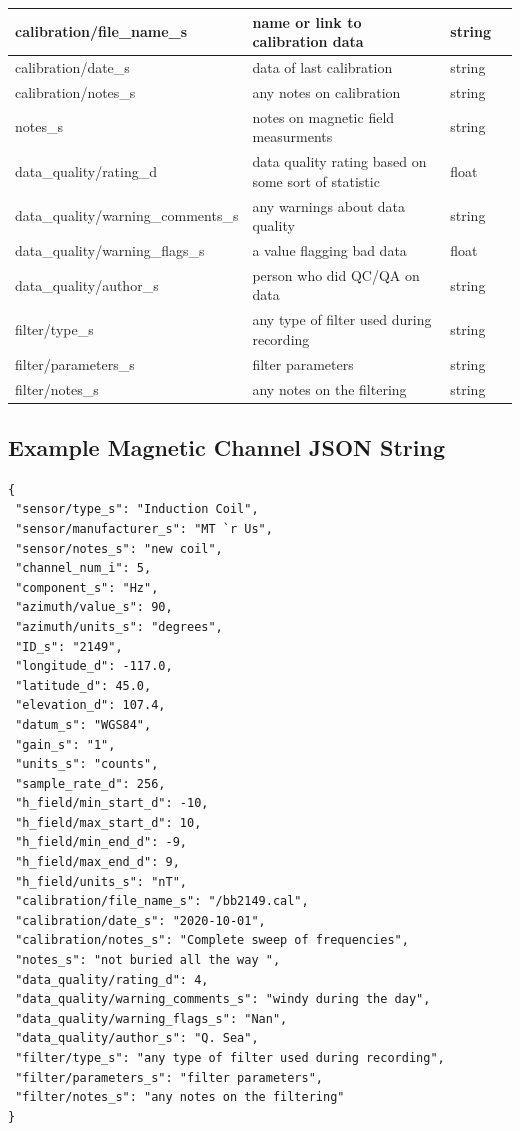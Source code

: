 \documentclass{article}
\begin{document}
\begin{table}[htb!]
\begin{tabular}{|l|p{3in}|l|l|}
		calibration/file\_name\_s & name or link to calibration data & string &  \\ \hline
		calibration/date\_s & data of last calibration & string &  \\ \hline
		calibration/notes\_s & any notes on calibration & string &  \\ \hline
		notes\_s & notes on magnetic field measurments & string &  \\ \hline
		data\_quality/rating\_d & data quality rating based on some sort of statistic & float &  \\ \hline
		data\_quality/warning\_comments\_s & any warnings about data quality & string &  \\ \hline
		data\_quality/warning\_flags\_s & a value flagging bad data  & float &  \\ \hline
		data\_quality/author\_s & person who did QC/QA on data & string &  \\ \hline
		filter/type\_s & any type of filter used during recording & string &  \\ \hline
		filter/parameters\_s & filter parameters & string &  \\ \hline
		filter/notes\_s & any notes on the filtering & string &  \\ \hline
		\end{tabular}
	\label{tab:magnetic}
\end{table}

\newpage
\subsection{Example Magnetic Channel JSON String}

\begin{verbatim}
{
 "sensor/type_s": "Induction Coil",
 "sensor/manufacturer_s": "MT `r Us",
 "sensor/notes_s": "new coil",
 "channel_num_i": 5,
 "component_s": "Hz",
 "azimuth/value_s": 90,
 "azimuth/units_s": "degrees",
 "ID_s": "2149",
 "longitude_d": -117.0,
 "latitude_d": 45.0,
 "elevation_d": 107.4,
 "datum_s": "WGS84",
 "gain_s": "1",
 "units_s": "counts",
 "sample_rate_d": 256,
 "h_field/min_start_d": -10,
 "h_field/max_start_d": 10,
 "h_field/min_end_d": -9,
 "h_field/max_end_d": 9,
 "h_field/units_s": "nT",
 "calibration/file_name_s": "/bb2149.cal",
 "calibration/date_s": "2020-10-01",
 "calibration/notes_s": "Complete sweep of frequencies",
 "notes_s": "not buried all the way ",
 "data_quality/rating_d": 4,
 "data_quality/warning_comments_s": "windy during the day",
 "data_quality/warning_flags_s": "Nan",
 "data_quality/author_s": "Q. Sea",
 "filter/type_s": "any type of filter used during recording",
 "filter/parameters_s": "filter parameters",
 "filter/notes_s": "any notes on the filtering"
}
\end{verbatim}
\end{document}
